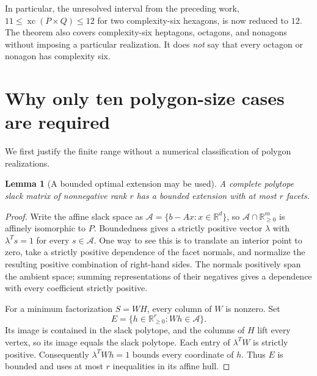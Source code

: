 \documentclass[11pt,a4paper]{article}
\newcommand{\xc}{\operatorname{xc}}
\newcommand{\R}{\mathbb R}
\newtheorem{lemma}[theorem]{Lemma}
\theoremstyle{definition}\newtheorem{definition}[theorem]{Definition}
\theoremstyle{remark}\newtheorem{remark}[theorem]{Remark}
\begin{document}
In particular, the unresolved interval from the preceding work,
$11\le\xc(P\times Q)\le12$ for two complexity-six hexagons, is now reduced to
$12$. The theorem also covers complexity-six heptagons, octagons, and nonagons
without imposing a particular realization. It does \emph{not} say that every
octagon or nonagon has complexity six.

\section{Why only ten polygon-size cases are required}\label{sec:finite}
We first justify the finite range without a numerical classification of
polygon realizations.

\begin{lemma}[A bounded optimal extension may be used]\label{lem:bounded}
A complete polytope slack matrix of nonnegative rank $r$ has a bounded
extension with at most $r$ facets.
\end{lemma}
\begin{proof}
Write the affine slack space as $\mathcal A=\{b-Ax:x\in\R^d\}$, so
$\mathcal A\cap\R^m_{\ge0}$ is affinely isomorphic to $P$. Boundedness gives
a strictly positive vector $\lambda$ with
$\lambda^Ts=1$ for every $s\in\mathcal A$. One way to see this is to translate
an interior point to zero, take a strictly positive dependence of the facet
normals, and normalize the resulting positive combination of right-hand sides.
The normals positively span the ambient space; summing representations of
their negatives gives a dependence with every coefficient strictly positive.

For a minimum factorization $S=WH$, every column of $W$ is nonzero. Set
\[
 E=\{h\in\R^r_{\ge0}:Wh\in\mathcal A\}.
\]
Its image is contained in the slack polytope, and the columns of $H$ lift every
vertex, so its image equals the slack polytope. Each entry of $\lambda^TW$ is
strictly positive. Consequently $\lambda^TWh=1$ bounds every coordinate of
$h$. Thus $E$ is bounded and uses at most $r$ inequalities in its affine hull.
\end{proof}
\end{document}
